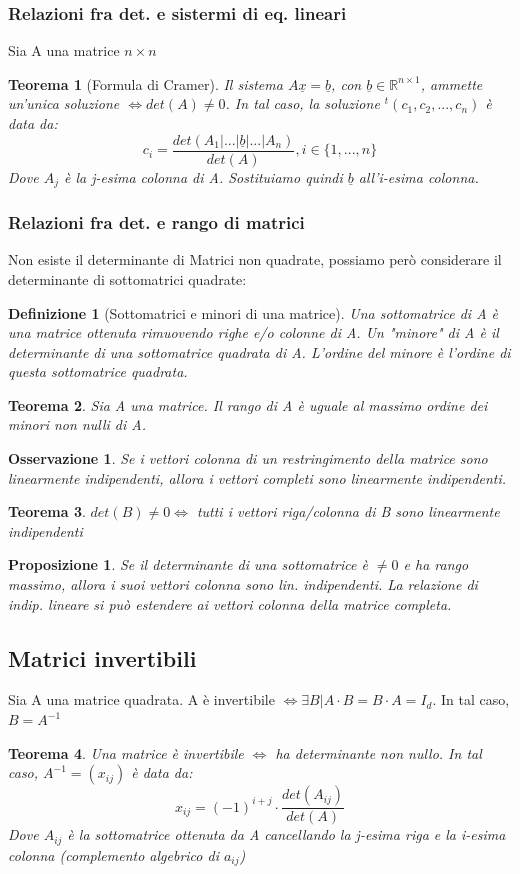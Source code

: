 \documentclass[12pt]{article}
\newenvironment{para}{\begin{adjustwidth}{13mm}{}}{\end{adjustwidth}}
\newtheorem{Definizione}{Definizione}[subsection]
\newtheorem{Teorema}{Teorema}[subsection]
\newtheorem{Proposizione}{Proposizione}[subsection]
\newtheorem{Osservazione}{Osservazione}[subsection]
\begin{document}
\begin{para}
\subsubsection{Relazioni fra det. e sistermi di eq. lineari}
Sia A una matrice $n\times n$
\begin{Teorema}[Formula di Cramer]
    Il sistema $A\underline{x} = \underline{b}$, con $\underline{b} \in \mathbb{R}^{n\times 1}$, ammette un'unica soluzione $\Leftrightarrow det(A) \neq 0$. In tal caso, la soluzione $^t(c_1, c_2, ..., c_n)$ è data da:
    $$c_i = \frac{det(A_1 | ... | \underline{b} |...| A_n)}{det(A)}, i\in\{1,...,n\}$$
    Dove $A_j$ è la j-esima colonna di A. Sostituiamo quindi $\underline{b}$ all'i-esima colonna.
\end{Teorema}
\subsubsection{Relazioni fra det. e rango di matrici}
Non esiste il determinante di Matrici non quadrate, possiamo però considerare il determinante di sottomatrici quadrate:
\begin{Definizione}[Sottomatrici e minori di una matrice]
    Una sottomatrice di A è una matrice ottenuta rimuovendo righe e/o colonne di A. Un "minore" di A è il determinante di una sottomatrice quadrata di A. L'ordine del minore è l'ordine di questa sottomatrice quadrata.
\end{Definizione}
\begin{Teorema}
    Sia A una matrice. Il rango di A è uguale al massimo ordine dei minori non nulli di A.
\end{Teorema}
\begin{Osservazione}
    Se i vettori colonna di un restringimento della matrice sono linearmente indipendenti, allora i vettori completi sono linearmente indipendenti.
\end{Osservazione}
\begin{Teorema}
    $det(B) \neq 0 \Leftrightarrow $ tutti i vettori riga/colonna di B sono linearmente indipendenti
\end{Teorema}
\begin{Proposizione}
    Se il determinante di una sottomatrice è $\neq 0$ e ha rango massimo, allora i suoi vettori colonna sono lin. indipendenti. La relazione di indip. lineare si può estendere ai vettori colonna della matrice completa.
\end{Proposizione}
\subsection{Matrici invertibili}
Sia A una matrice quadrata. A è invertibile $\Leftrightarrow \exists B|A \cdot B = B\cdot A = I_d$. In tal caso, $B = A^{-1}$
\begin{Teorema}
    Una matrice è invertibile $\Leftrightarrow$ ha determinante non nullo. In tal caso, $A^{-1} = (x_{ij})$ è data da:
    $$x_{ij} = (-1)^{i+j}\cdot \frac{det(A_{ij})}{det(A)}$$ Dove $A_{ij}$ è la sottomatrice ottenuta da A cancellando la j-esima riga e la i-esima colonna (complemento algebrico di $a_{ij}$)
\end{Teorema}

\end{para}
\end{document}
